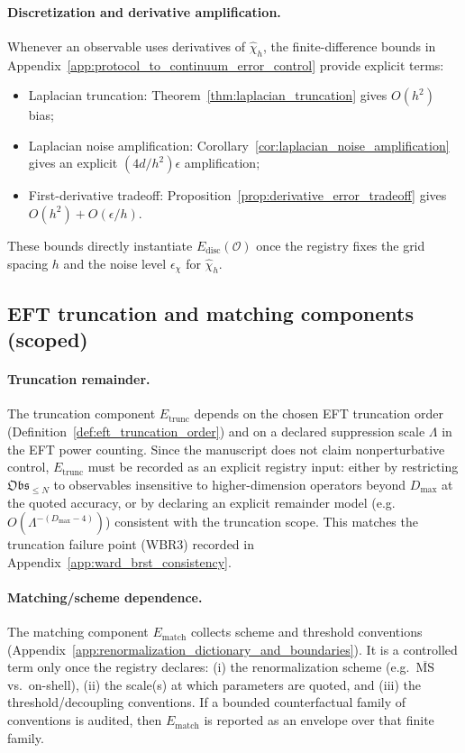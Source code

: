 \paragraph{Discretization and derivative amplification.}
Whenever an observable uses derivatives of $\widehat\chi_h$, the finite-difference bounds in Appendix~\ref{app:protocol_to_continuum_error_control} provide explicit terms:
\begin{itemize}
\item Laplacian truncation: Theorem~\ref{thm:laplacian_truncation} gives $O(h^2)$ bias;
\item Laplacian noise amplification: Corollary~\ref{cor:laplacian_noise_amplification} gives an explicit $(4d/h^2)\epsilon$ amplification;
\item First-derivative tradeoff: Proposition~\ref{prop:derivative_error_tradeoff} gives $O(h^2)+O(\epsilon/h)$.
\end{itemize}
These bounds directly instantiate $E_{\mathrm{disc}}(\mathcal{O})$ once the registry fixes the grid spacing $h$ and the noise level $\epsilon_\chi$ for $\widehat\chi_h$.

\subsection{EFT truncation and matching components (scoped)}

\paragraph{Truncation remainder.}
\AuditTag The truncation component $E_{\mathrm{trunc}}$ depends on the chosen EFT truncation order (Definition~\ref{def:eft_truncation_order}) and on a declared suppression scale $\Lambda$ in the EFT power counting.
Since the manuscript does not claim nonperturbative control, $E_{\mathrm{trunc}}$ must be recorded as an explicit registry input:
either by restricting $\mathfrak{Obs}_{\le N}$ to observables insensitive to higher-dimension operators beyond $D_{\max}$ at the quoted accuracy,
or by declaring an explicit remainder model (e.g.\ $O(\Lambda^{-(D_{\max}-4)})$) consistent with the truncation scope.
This matches the truncation failure point (WBR3) recorded in Appendix~\ref{app:ward_brst_consistency}.

\paragraph{Matching/scheme dependence.}
\MatchTag The matching component $E_{\mathrm{match}}$ collects scheme and threshold conventions (Appendix~\ref{app:renormalization_dictionary_and_boundaries}).
It is a controlled term only once the registry declares:
(i) the renormalization scheme (e.g.\ $\overline{\mathrm{MS}}$ vs.\ on-shell),
(ii) the scale(s) at which parameters are quoted,
and (iii) the threshold/decoupling conventions.
If a bounded counterfactual family of conventions is audited, then $E_{\mathrm{match}}$ is reported as an envelope over that finite family.

